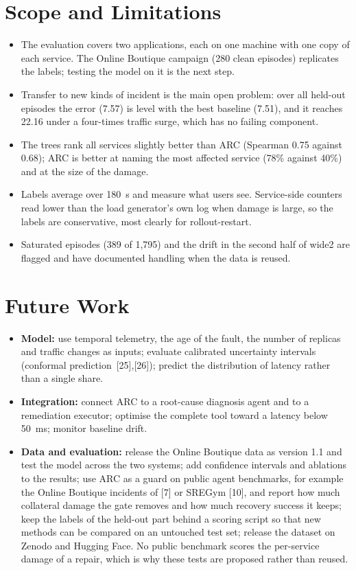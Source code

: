 \section{Scope and Limitations}
\begin{itemize}
\item The evaluation covers two applications, each on one machine with one copy of each service. The Online Boutique campaign (280 clean episodes) replicates the labels; testing the model on it is the next step.
\item Transfer to new kinds of incident is the main open problem: over all held-out episodes the error (7.57) is level with the best baseline (7.51), and it reaches 22.16 under a four-times traffic surge, which has no failing component.
\item The trees rank all services slightly better than ARC (Spearman 0.75 against 0.68); ARC is better at naming the most affected service (78\% against 40\%) and at the size of the damage.
\item Labels average over 180~s and measure what users see. Service-side counters read lower than the load generator's own log when damage is large, so the labels are conservative, most clearly for rollout-restart.
\item Saturated episodes (389 of 1,795) and the drift in the second half of wide2 are flagged and have documented handling when the data is reused.
\end{itemize}

\section{Future Work}
\begin{itemize}
\item \textbf{Model:} use temporal telemetry, the age of the fault, the number of replicas and traffic changes as inputs; evaluate calibrated uncertainty intervals (conformal prediction~[25],[26]); predict the distribution of latency rather than a single share.
\item \textbf{Integration:} connect ARC to a root-cause diagnosis agent and to a remediation executor; optimise the complete tool toward a latency below 50~ms; monitor baseline drift.
\item \textbf{Data and evaluation:} release the Online Boutique data as version 1.1 and test the model across the two systems; add confidence intervals and ablations to the results; use ARC as a guard on public agent benchmarks, for example the Online Boutique incidents of [7] or SREGym [10], and report how much collateral damage the gate removes and how much recovery success it keeps; keep the labels of the held-out part behind a scoring script so that new methods can be compared on an untouched test set; release the dataset on Zenodo and Hugging Face. No public benchmark scores the per-service damage of a repair, which is why these tests are proposed rather than reused.
\end{itemize}

